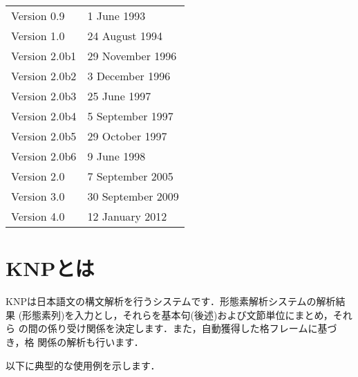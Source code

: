 \documentclass[a4j,11pt,titlepage]{jarticle}
\begin{document}
\begin{small}
\begin{tabular}{ll}
 Version 0.9 & 1 June 1993 \\
 Version 1.0 & 24 August 1994 \\
 Version 2.0b1 & 29 November 1996 \\
 Version 2.0b2 & 3 December 1996 \\
 Version 2.0b3 & 25 June 1997 \\
 Version 2.0b4 & 5 September 1997 \\
 Version 2.0b5 & 29 October 1997 \\
 Version 2.0b6 & 9 June 1998 \\
 Version 2.0 & 7 September 2005 \\
 Version 3.0 & 30 September 2009 \\
 Version 4.0 & 12 January 2012 \\
\end{tabular}
\end{small}

\clearpage

\tableofcontents

\clearpage
{}

\section{KNPとは}

KNPは日本語文の構文解析を行うシステムです．形態素解析システムの解析結果
(形態素列)を入力とし，それらを基本句(後述)および文節単位にまとめ，それら
の間の係り受け関係を決定します．また，自動獲得した格フレームに基づき，格
関係の解析も行います．

以下に典型的な使用例を示します．
\end{document}
